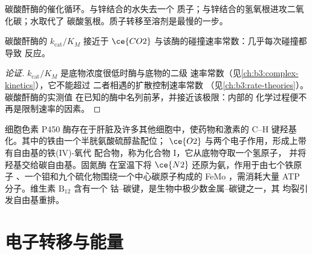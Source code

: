 \begin{omfigure}

{\small 碳酸酐酶的催化循环。与锌结合的水失去一个
质子；与锌结合的氢氧根进攻二氧化碳；水取代了
碳酸氢根。质子转移至溶剂是最慢的一步。}
\end{omfigure}

\begin{proposition}[快速的酶]\label{prop:b3:bioinorganic:carbonic-anhydrase}
碳酸酐酶的 $k_{\mathrm{cat}}/K_M$ 接近于
$\ce{CO2}$ 与该酶的碰撞速率常数：几乎每次碰撞都导致
反应。
\end{proposition}

\begin{proof}[论证]
$k_{\mathrm{cat}}/K_M$ 是底物浓度很低时酶与底物的二级
速率常数（见\cref{ch:b3:complex-kinetics}），它不能超过
二者相遇的扩散控制速率常数
（见\cref{ch:b3:rate-theories}）。碳酸酐酶的实测值
在已知的酶中名列前茅，并接近该极限：内部的
化学过程便不再是限制速率的因素。
\end{proof}

细胞色素 P450 酶存在于肝脏及许多其他细胞中，使药物和激素的 C--H
键羟基化。其中的铁由一个半胱氨酸硫醇盐配位；
$\ce{O2}$ 与两个电子作用，形成上带有自由基的铁(IV)-氧代
配合物，称为化合物 I，它从底物夺取一个氢原子，
并将羟基交给碳自由基。固氮酶
在室温下将 $\ce{N2}$ 还原为氨，作用于由七个铁原子
、一个钼和九个硫化物围绕一个中心碳原子构成的 FeMo
，需消耗大量 ATP 分子。维生素 $\mathrm{B_{12}}$ 含有一个
钴–碳键，是生物中极少数金属–碳键之一，其
均裂引发自由基重排。

\section{电子转移与能量}


